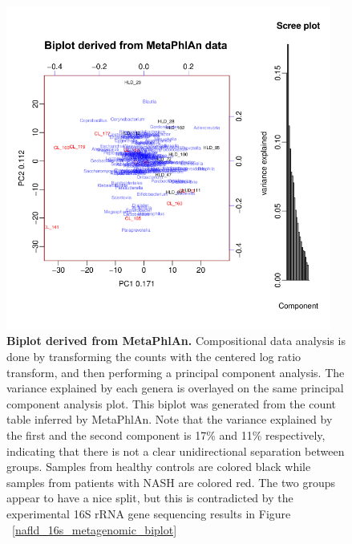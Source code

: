 \begin{figure}[h]
\begin{center}
\includegraphics[width=0.95\textwidth]{metaphlan_biplot.png}
\caption[Biplot derived from MetaPhlAn.]{\textbf{Biplot derived from MetaPhlAn.} Compositional data analysis is done by transforming the counts with the centered log ratio transform, and then performing a principal component analysis. The variance explained by each genera is overlayed on the same principal component analysis plot. This biplot was generated from the count table inferred by MetaPhlAn. Note that the variance explained by the first and the second component is 17\% and 11\% respectively, indicating that there is not a clear unidirectional separation between groups. Samples from healthy controls are colored black while samples from patients with NASH are colored red. The two groups appear to have a nice split, but this is contradicted by the experimental 16S rRNA gene sequencing results in Figure ~\ref{nafld_16s_metagenomic_biplot}}
\label{nafld_metaphlan_biplot}
\end{center}
\end{figure}

